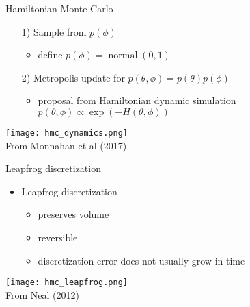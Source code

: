 \documentclass[finnish,english,t]{beamer}
\DeclareMathOperator{\normal}{normal}
\begin{document}
\begin{frame}{Hamiltonian Monte Carlo}

  \begin{itemize}
  \item[1)] Sample from $p(\phi)$
    \begin{itemize}
    \item define $p(\phi) = \normal(0,1)$
    \end{itemize}
  \item[2)] Metropolis update for $p(\theta,\phi)=p(\theta)p(\phi)$
    \begin{itemize}
    \item proposal from Hamiltonian dynamic simulation $p(\theta,\phi) \propto \exp(-H(\theta,\phi))$
    \end{itemize}
  
  \end{itemize}
  \texttt{[image: hmc\_dynamics.png]}\\
  {\footnotesize From Monnahan et al (2017)}
  
\end{frame}

\begin{frame}{Leapfrog discretization}

  \begin{itemize}
  \item Leapfrog discretization
    \begin{itemize}
    \item preserves volume
    \item reversible
    \item discretization error does not usually grow in time
    \end{itemize}
  \end{itemize}
  {\texttt{[image: hmc\_leapfrog.png]}}
  \\
  {\footnotesize From Neal (2012)}
  
\end{frame}
\end{document}
